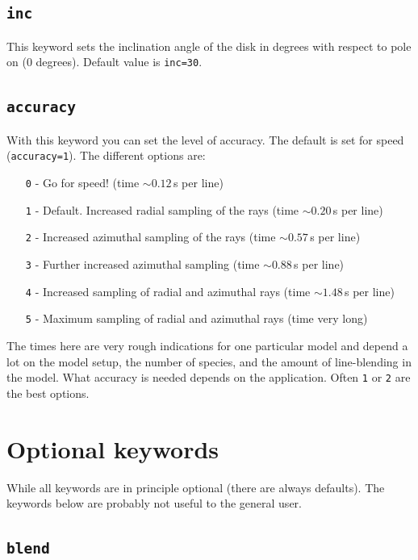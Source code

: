\documentclass[12pt]{article}
\begin{document}
\subsection*{\texttt{inc}}

This keyword sets the inclination angle of the disk in degrees with respect to pole on (0 degrees). Default value is \texttt{inc=30}.

\subsection*{\texttt{accuracy}}

With this keyword you can set the level of accuracy. The default is set for speed (\texttt{accuracy=1}). The different options are:
\begin{itemize}
\item[\texttt{0} -] Go for speed! (time $\sim 0.12\,$s per line)
\item[\texttt{1} -] Default. Increased radial sampling of the rays (time $\sim 0.20\,$s per line)
\item[\texttt{2} -] Increased azimuthal sampling of the rays (time $\sim 0.57\,$s per line)
\item[\texttt{3} -] Further increased azimuthal sampling (time $\sim 0.88\,$s per line)
\item[\texttt{4} -] Increased sampling of radial and azimuthal rays (time $\sim 1.48\,$s per line)
\item[\texttt{5} -] Maximum sampling of radial and azimuthal rays (time very long)
\end{itemize}
The times here are very rough indications for one particular model and depend a lot on the model setup, the number of species, and the amount of line-blending in the model. What accuracy is needed depends on the application. Often \texttt{1} or \texttt{2} are the best options.

\section{Optional keywords}

While all keywords are in principle optional (there are always defaults). The keywords below are probably not useful to the general user.

\subsection*{\texttt{blend}}
\end{document}
